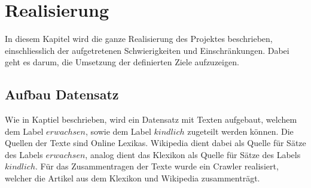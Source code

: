 \chapter{Realisierung}
\label{ch:Realisierung}
In diesem Kapitel wird die ganze Realisierung des Projektes beschrieben, einschliesslich der aufgetretenen
Schwierigkeiten und Einschränkungen. Dabei geht es darum, die Umsetzung der definierten Ziele aufzuzeigen.

\section{Aufbau Datensatz}
\label{sec:aufbau_datensatz}
Wie in Kaptiel  beschrieben, wird ein Datensatz mit Texten aufgebaut,
welchem dem Label $ erwachsen $, sowie dem Label $ kindlich $ zugeteilt werden können. Die Quellen der Texte sind Online
Lexikas. Wikipedia dient dabei als Quelle für Sätze des Labels $ erwachsen $, analog dient das Klexikon als Quelle für
Sätze des Labels $ kindlich $. Für das Zusammentragen der Texte wurde ein Crawler realisiert, welcher die Artikel aus
dem Klexikon und Wikipedia zusammenträgt.

